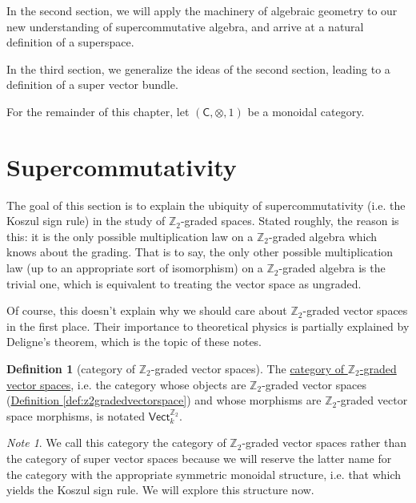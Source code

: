 \documentclass[a4paper,10pt]{scrreprt}
\newcommand{\Z}{\mathbb{Z}}
\newcommand{\defn}[1]{\ul{#1}}
\theoremstyle{definition}
\newtheorem{definition}{Definition}[section]
\theoremstyle{plain}
\theoremstyle{remark}
\newtheorem{note}{Note}[section]
\begin{document}
In the second section, we will apply the machinery of algebraic geometry to our new understanding of supercommutative algebra, and arrive at a natural definition of a superspace.

In the third section, we generalize the ideas of the second section, leading to a definition of a super vector bundle.

For the remainder of this chapter, let $(\mathsf{C}, \otimes, 1)$ be a monoidal category.

\section{Supercommutativity}
The goal of this section is to explain the ubiquity of supercommutativity (i.e. the Koszul sign rule) in the study of $\Z_{2}$-graded spaces. Stated roughly, the reason is this: it is the only possible multiplication law on a $\Z_{2}$-graded algebra which knows about the grading. That is to say, the only other possible multiplication law (up to an appropriate sort of isomorphism) on a $\Z_{2}$-graded algebra is the trivial one, which is equivalent to treating the vector space as ungraded. 

Of course, this doesn't explain why we should care about $\Z_{2}$-graded vector spaces in the first place. Their importance to theoretical physics is partially explained by Deligne's theorem, which is the topic of these notes.

\begin{definition}[category of $\Z_{2}$-graded vector spaces]
  \label{def:categoryofz2gradedvectorspaces}
  The \defn{category of $\Z_{2}$-graded vector spaces}, i.e. the category whose objects are $\Z_{2}$-graded vector spaces (\hyperref[def:z2gradedvectorspace]{Definition \ref*{def:z2gradedvectorspace}}) and whose morphisms are $\Z_{2}$-graded vector space morphisms, is notated $\mathsf{Vect}_{k}^{\Z_{2}}$.
\end{definition}

\begin{note}
  We call this category the category of $\Z_{2}$-graded vector spaces rather than the category of super vector spaces because we will reserve the latter name for the category with the appropriate symmetric monoidal structure, i.e. that which yields the Koszul sign rule. We will explore this structure now.
\end{note}
\end{document}

